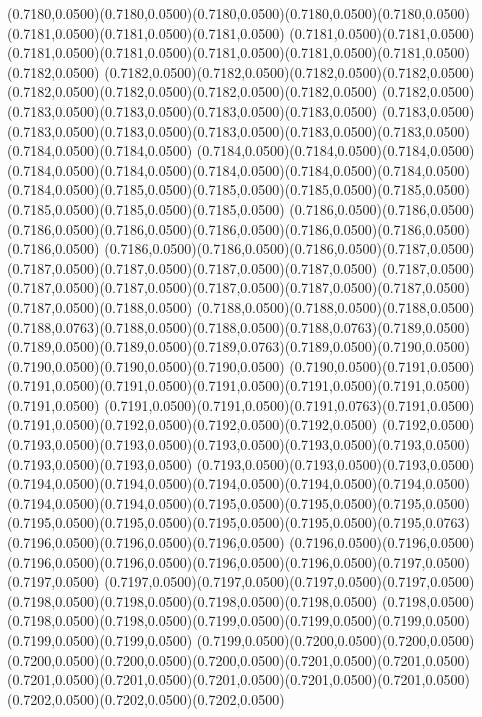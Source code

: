(0.7180,0.0500)(0.7180,0.0500)(0.7180,0.0500)(0.7180,0.0500)(0.7180,0.0500)(0.7181,0.0500)(0.7181,0.0500)(0.7181,0.0500)
(0.7181,0.0500)(0.7181,0.0500)(0.7181,0.0500)(0.7181,0.0500)(0.7181,0.0500)(0.7181,0.0500)(0.7181,0.0500)(0.7182,0.0500)
(0.7182,0.0500)(0.7182,0.0500)(0.7182,0.0500)(0.7182,0.0500)(0.7182,0.0500)(0.7182,0.0500)(0.7182,0.0500)(0.7182,0.0500)
(0.7182,0.0500)(0.7183,0.0500)(0.7183,0.0500)(0.7183,0.0500)(0.7183,0.0500)
\PST@Solid(0.7183,0.0500)(0.7183,0.0500)(0.7183,0.0500)(0.7183,0.0500)(0.7183,0.0500)(0.7183,0.0500)(0.7184,0.0500)(0.7184,0.0500)
(0.7184,0.0500)(0.7184,0.0500)(0.7184,0.0500)(0.7184,0.0500)(0.7184,0.0500)(0.7184,0.0500)(0.7184,0.0500)(0.7184,0.0500)
(0.7184,0.0500)(0.7185,0.0500)(0.7185,0.0500)(0.7185,0.0500)(0.7185,0.0500)(0.7185,0.0500)(0.7185,0.0500)(0.7185,0.0500)
(0.7186,0.0500)(0.7186,0.0500)(0.7186,0.0500)(0.7186,0.0500)(0.7186,0.0500)(0.7186,0.0500)(0.7186,0.0500)(0.7186,0.0500)
(0.7186,0.0500)(0.7186,0.0500)(0.7186,0.0500)(0.7187,0.0500)(0.7187,0.0500)(0.7187,0.0500)(0.7187,0.0500)(0.7187,0.0500)
(0.7187,0.0500)(0.7187,0.0500)(0.7187,0.0500)(0.7187,0.0500)(0.7187,0.0500)(0.7187,0.0500)(0.7187,0.0500)(0.7188,0.0500)
(0.7188,0.0500)(0.7188,0.0500)(0.7188,0.0500)(0.7188,0.0763)(0.7188,0.0500)(0.7188,0.0500)(0.7188,0.0763)(0.7189,0.0500)
(0.7189,0.0500)(0.7189,0.0500)(0.7189,0.0763)(0.7189,0.0500)(0.7190,0.0500)(0.7190,0.0500)(0.7190,0.0500)(0.7190,0.0500)
(0.7190,0.0500)(0.7191,0.0500)(0.7191,0.0500)(0.7191,0.0500)(0.7191,0.0500)(0.7191,0.0500)(0.7191,0.0500)(0.7191,0.0500)
(0.7191,0.0500)(0.7191,0.0500)(0.7191,0.0763)(0.7191,0.0500)(0.7191,0.0500)(0.7192,0.0500)(0.7192,0.0500)(0.7192,0.0500)
(0.7192,0.0500)(0.7193,0.0500)(0.7193,0.0500)(0.7193,0.0500)(0.7193,0.0500)(0.7193,0.0500)(0.7193,0.0500)(0.7193,0.0500)
(0.7193,0.0500)(0.7193,0.0500)(0.7193,0.0500)(0.7194,0.0500)(0.7194,0.0500)(0.7194,0.0500)(0.7194,0.0500)(0.7194,0.0500)
(0.7194,0.0500)(0.7194,0.0500)(0.7195,0.0500)(0.7195,0.0500)(0.7195,0.0500)
\PST@Solid(0.7195,0.0500)(0.7195,0.0500)(0.7195,0.0500)(0.7195,0.0500)(0.7195,0.0763)(0.7196,0.0500)(0.7196,0.0500)(0.7196,0.0500)
(0.7196,0.0500)(0.7196,0.0500)(0.7196,0.0500)(0.7196,0.0500)(0.7196,0.0500)(0.7196,0.0500)(0.7197,0.0500)(0.7197,0.0500)
(0.7197,0.0500)(0.7197,0.0500)(0.7197,0.0500)(0.7197,0.0500)(0.7198,0.0500)(0.7198,0.0500)(0.7198,0.0500)(0.7198,0.0500)
(0.7198,0.0500)(0.7198,0.0500)(0.7198,0.0500)(0.7199,0.0500)(0.7199,0.0500)(0.7199,0.0500)(0.7199,0.0500)(0.7199,0.0500)
(0.7199,0.0500)(0.7200,0.0500)(0.7200,0.0500)(0.7200,0.0500)(0.7200,0.0500)(0.7200,0.0500)(0.7201,0.0500)(0.7201,0.0500)
(0.7201,0.0500)(0.7201,0.0500)(0.7201,0.0500)(0.7201,0.0500)(0.7201,0.0500)(0.7202,0.0500)(0.7202,0.0500)(0.7202,0.0500)
